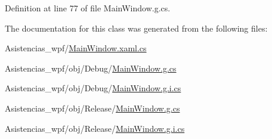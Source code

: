 Definition at line 77 of file Main\-Window.\-g.\-cs.



The documentation for this class was generated from the following files\-:\begin{DoxyCompactItemize}
\item 
Asistencias\-\_\-wpf/\hyperlink{_asistencias__wpf_2_main_window_8xaml_8cs}{Main\-Window.\-xaml.\-cs}\item 
Asistencias\-\_\-wpf/obj/\-Debug/\hyperlink{_asistencias__wpf_2obj_2_debug_2_main_window_8g_8cs}{Main\-Window.\-g.\-cs}\item 
Asistencias\-\_\-wpf/obj/\-Debug/\hyperlink{_asistencias__wpf_2obj_2_debug_2_main_window_8g_8i_8cs}{Main\-Window.\-g.\-i.\-cs}\item 
Asistencias\-\_\-wpf/obj/\-Release/\hyperlink{_asistencias__wpf_2obj_2_release_2_main_window_8g_8cs}{Main\-Window.\-g.\-cs}\item 
Asistencias\-\_\-wpf/obj/\-Release/\hyperlink{_asistencias__wpf_2obj_2_release_2_main_window_8g_8i_8cs}{Main\-Window.\-g.\-i.\-cs}\end{DoxyCompactItemize}
